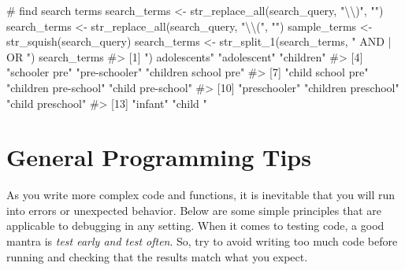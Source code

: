 \documentclass[
  letterpaper,
]{krantz}
\makeatletter
\newenvironment{Shaded}{\begin{snugshade}}{\end{snugshade}}
\newcommand{\CommentTok}[1]{\textcolor[rgb]{0.37,0.37,0.37}{#1}}
\newcommand{\FunctionTok}[1]{\textcolor[rgb]{0.28,0.35,0.67}{#1}}
\newcommand{\NormalTok}[1]{\textcolor[rgb]{0.00,0.23,0.31}{#1}}
\newcommand{\OtherTok}[1]{\textcolor[rgb]{0.00,0.23,0.31}{#1}}
\newcommand{\SpecialCharTok}[1]{\textcolor[rgb]{0.37,0.37,0.37}{#1}}
\newcommand{\StringTok}[1]{\textcolor[rgb]{0.13,0.47,0.30}{#1}}
\newenvironment{kframe}{%
\medskip{}
\setlength{\fboxsep}{.8em}
 \def\at@end@of@kframe{}%
 \ifinner\ifhmode%
  \def\at@end@of@kframe{\end{minipage}}%
  \begin{minipage}{\columnwidth}%
 \fi\fi%
 \def\FrameCommand##1{\hskip\@totalleftmargin \hskip-\fboxsep
 \colorbox{shadecolor}{##1}\hskip-\fboxsep
     \hskip-\linewidth \hskip-\@totalleftmargin \hskip\columnwidth}%
 \MakeFramed {\advance\hsize-\width
   \@totalleftmargin\z@ \linewidth\hsize
   \@setminipage}}%
 {\par\unskip\endMakeFramed%
 \at@end@of@kframe}
\renewenvironment{Shaded}{\begin{kframe}}{\end{kframe}}
\makeatother
\begin{document}
\begin{Shaded}
\begin{Highlighting}[]
\CommentTok{\# find search terms}
\NormalTok{search\_terms }\OtherTok{\textless{}{-}} \FunctionTok{str\_replace\_all}\NormalTok{(search\_query, }\StringTok{"}\SpecialCharTok{\textbackslash{}\textbackslash{}}\StringTok{)"}\NormalTok{, }\StringTok{""}\NormalTok{)}
\NormalTok{search\_terms }\OtherTok{\textless{}{-}} \FunctionTok{str\_replace\_all}\NormalTok{(search\_query, }\StringTok{"}\SpecialCharTok{\textbackslash{}\textbackslash{}}\StringTok{("}\NormalTok{, }\StringTok{""}\NormalTok{)}
\NormalTok{sample\_terms }\OtherTok{\textless{}{-}} \FunctionTok{str\_squish}\NormalTok{(search\_query)}
\NormalTok{search\_terms }\OtherTok{\textless{}{-}} \FunctionTok{str\_split\_1}\NormalTok{(search\_terms, }\StringTok{" AND | OR "}\NormalTok{)}
\NormalTok{search\_terms}
\CommentTok{\#\textgreater{}  [1] ") adolescents"       "adolescent"          "children"           }
\CommentTok{\#\textgreater{}  [4] "schooler pre"        "pre{-}schooler"        "children school pre"}
\CommentTok{\#\textgreater{}  [7] "child school pre"    "children pre{-}school" "child pre{-}school"   }
\CommentTok{\#\textgreater{} [10] "preschooler"         "children preschool"  "child preschool"    }
\CommentTok{\#\textgreater{} [13] "infant"              "child "}
\end{Highlighting}
\end{Shaded}

\section{General Programming Tips}\label{general-programming-tips}

As you write more complex code and functions, it is inevitable that you
will run into errors or unexpected behavior. Below are some simple
principles that are applicable to debugging in any setting. When it
comes to testing code, a good mantra is \emph{test early and test
often}. So, try to avoid writing too much code before running and
checking that the results match what you expect.
\end{document}
